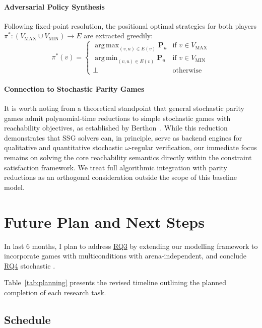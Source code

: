 \documentclass{article}
\begin{document}
\paragraph{Adversarial Policy Synthesis}
Following fixed-point resolution, the positional optimal strategies for both players $\pi^* : (V_{\text{MAX}} \cup V_{\text{MIN}}) \to E$ are extracted greedily:
\begin{equation}
\pi^*(v) = 
\begin{cases}
\operatorname{arg\,max}_{(v, u) \in E(v)} \mathbf{P}_u & \text{if } v \in V_{\text{MAX}} \\
\operatorname{arg\,min}_{(v, u) \in E(v)} \mathbf{P}_u & \text{if } v \in V_{\text{MIN}} \\
\bot & \text{otherwise}
\end{cases}
\end{equation}

\paragraph{Connection to Stochastic Parity Games}
It is worth noting from a theoretical standpoint that general stochastic parity games admit polynomial-time reductions to simple stochastic games with reachability objectives, as established by Berthon~\cite{Berthon:2017:reduction}. While this reduction demonstrates that SSG solvers can, in principle, serve as backend engines for qualitative and quantitative stochastic $\omega$-regular verification, our immediate focus remains on solving the core reachability semantics directly within the constraint satisfaction framework. We treat full algorithmic integration with parity reductions as an orthogonal consideration outside the scope of this baseline model.

\section{Future Plan and Next Steps}

In last 6 months, I plan to address \hyperref[sec:rq]{RQ3} by extending our modelling framework to incorporate games with multiconditions with arena-independent, and conclude \hyperref[sec:rq]{RQ4} stochastic \wregulargames.


Table~\ref{tab:planning} presents the revised timeline outlining the planned completion of each research task.

\subsection{Schedule}
\end{document}
